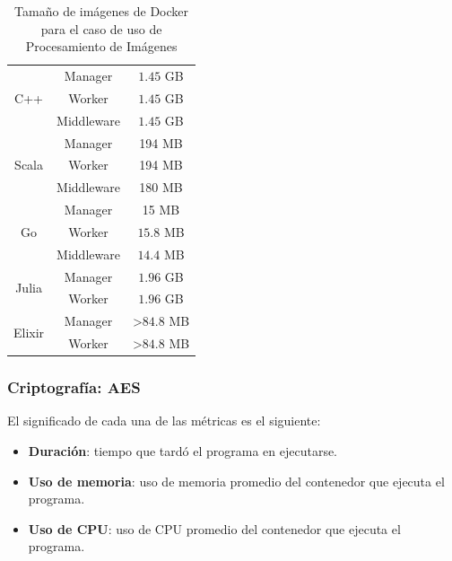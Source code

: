 \documentclass[11pt]{article}
\let\Oldsubsubsection\subsubsection
\renewcommand{\subsubsection}{\FloatBarrier\Oldsubsubsection}
\begin{document}
\begin{table}[H]
\centering
\begin{tabular}{|ccc|}
\hline
\multicolumn{1}{|c|}{\multirow{3}{*}{C++}} & \multicolumn{1}{c|}{Manager} & $1.45$ GB \\ \cline{2-3} 
\multicolumn{1}{|c|}{} & \multicolumn{1}{c|}{Worker} & $1.45$ GB \\ \cline{2-3} 
\multicolumn{1}{|c|}{} & \multicolumn{1}{c|}{Middleware} & $1.45$ GB \\ \hline
\multicolumn{1}{|c|}{\multirow{3}{*}{Scala}} & \multicolumn{1}{c|}{Manager} & 194 MB \\ \cline{2-3} 
\multicolumn{1}{|c|}{} & \multicolumn{1}{c|}{Worker} & 194 MB \\ \cline{2-3} 
\multicolumn{1}{|c|}{} & \multicolumn{1}{c|}{Middleware} & 180 MB \\ \hline
\multicolumn{1}{|c|}{\multirow{3}{*}{Go}} & \multicolumn{1}{c|}{Manager} & 15 MB \\ \cline{2-3} 
\multicolumn{1}{|c|}{} & \multicolumn{1}{c|}{Worker} & $15.8$ MB \\ \cline{2-3} 
\multicolumn{1}{|c|}{} & \multicolumn{1}{c|}{Middleware} & $14.4$ MB \\ \hline
\multicolumn{1}{|c|}{\multirow{2}{*}{Julia}} & \multicolumn{1}{c|}{Manager} & $1.96$ GB \\ \cline{2-3} 
\multicolumn{1}{|c|}{} & \multicolumn{1}{c|}{Worker} & $1.96$ GB \\ \hline
\multicolumn{1}{|c|}{\multirow{2}{*}{Elixir}} & \multicolumn{1}{c|}{Manager} & \textgreater{}$84.8$ MB \\ \cline{2-3} 
\multicolumn{1}{|c|}{} & \multicolumn{1}{c|}{Worker} & \textgreater{}$84.8$ MB \\ \hline
\end{tabular}
\caption{Tamaño de imágenes de Docker para el caso de uso de Procesamiento de Imágenes}
\label{tab:ip:image_sizes}
\end{table}

\subsubsection{Criptografía: AES} \label{sec:anex:metrics:aes}

El significado de cada una de las métricas es el siguiente:

\begin{itemize}
    \item \textbf{Duración}: tiempo que tardó el programa en ejecutarse.
    \item \textbf{Uso de memoria}: uso de memoria promedio del contenedor que ejecuta el programa.
    \item \textbf{Uso de CPU}: uso de CPU promedio del contenedor que ejecuta el programa.
\end{itemize}
\end{document}

